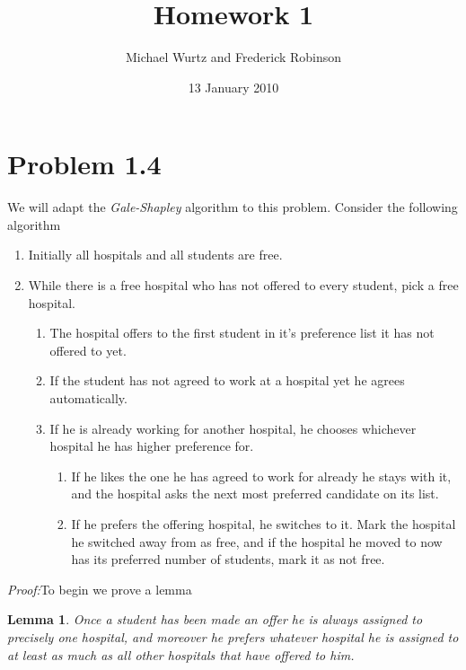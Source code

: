 \documentclass{article}
\title{Homework 1}
\author{Michael Wurtz and Frederick Robinson}
\date{13 January 2010}
\newtheorem{lemma}[theorem]{Lemma}
\begin{document}

   \maketitle



\section{Problem 1.4}

We will adapt the \emph{Gale-Shapley} algorithm to this problem. Consider the following algorithm

\begin{enumerate}
\item\label{g-s}Initially all hospitals and all students are free.\item While there is a free hospital who has not offered to every student, pick a free hospital.\begin{enumerate}
\item The hospital offers to the first student in it's preference list it has not offered to yet.\item If the student has not agreed to work at a hospital yet he agrees automatically.
\item If he is already working for another hospital, he chooses whichever hospital he has higher preference for.
\begin{enumerate}
\item If he likes the one he has agreed to work for already he stays with it, and the hospital asks the next most preferred candidate on its list.
\item \label{swap} If he prefers the offering hospital, he switches to it. Mark the hospital he switched away from as free, and if the hospital he moved to now has its preferred number of students, mark it as not free.
\end{enumerate}
\end{enumerate}
\end{enumerate}

\emph{Proof:}To begin we prove a lemma

\begin{lemma}\label{stayassigned} Once a student has been made an offer he is always assigned to precisely one hospital, and moreover he prefers whatever hospital he is assigned to at least as much as all other hospitals that have offered to him.
\end{lemma}
\end{document}
